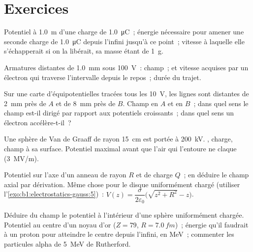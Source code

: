 \section{Exercices}

\begin{exercise}[$\star$]\label{exo:b1:potential-capacitors:1}
Potentiel à \qty{1.0}{m} d'une charge de \qty{1.0}{\micro C}~; énergie
nécessaire pour amener une seconde charge de \qty{1.0}{\micro C} depuis
l'infini jusqu'à ce point~; vitesse à laquelle elle s'échapperait si on la
libérait, sa masse étant de \qty{1}{g}.
\end{exercise}

\begin{exercise}[$\star$]\label{exo:b1:potential-capacitors:2}
Armatures distantes de \qty{1.0}{mm} sous \qty{100}{V}~: champ~;  et vitesse acquises par un électron qui traverse l'intervalle depuis
le repos~; durée du trajet.
\end{exercise}

\begin{exercise}[$\star$]\label{exo:b1:potential-capacitors:3}
Sur une carte d'équipotentielles tracées tous les \qty{10}{V}, les lignes sont
distantes de \qty{2}{mm} près de $A$ et de \qty{8}{mm} près de $B$. Champ en $A$
et en $B$~; dans quel sens le champ est-il dirigé par rapport aux potentiels
croissants~; dans quel sens un électron accélère-t-il~?
\end{exercise}

\begin{exercise}[$\star$]\label{exo:b1:potential-capacitors:4}
Une sphère de Van de Graaff de rayon \qty{15}{cm} est portée à \qty{200}{kV}.
, charge, champ à sa surface. Potentiel maximal avant que l'air qui
l'entoure ne claque (\qty{3}{MV/m}).
\end{exercise}

\begin{exercise}[$\star\star$]\label{exo:b1:potential-capacitors:5}
Potentiel sur l'axe d'un anneau de rayon $R$ et de charge $Q$~; en déduire le
champ axial par dérivation. Même chose pour le disque uniformément chargé
(utiliser l'\cref{exo:b1:electrostatics-gauss:5})~: $V(z) = \dfrac{\sigma}{2\varepsilon_0}
\bigl(\sqrt{z^2 + R^2} - z\bigr)$.
\end{exercise}

\begin{exercise}[$\star\star$]\label{exo:b1:potential-capacitors:6}
Déduire du champ le potentiel à l'intérieur d'une sphère uniformément chargée.
Potentiel au centre d'un noyau d'or ($Z = 79$, $R = \qty{7.0}{fm}$)~; énergie
qu'il faudrait à un proton pour atteindre le centre depuis l'infini, en
\unit{MeV}~; commenter les particules alpha de \qty{5}{MeV} de Rutherford.
\end{exercise}

